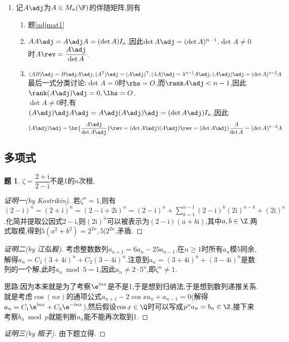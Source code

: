 \documentclass{article}
\newcommand{\T}{\mathsf{T}}
\renewcommand{\i}{\mathrm{i}}
\theoremstyle{definition}
\newtheorem{exercise}{题}[section]
\begin{document}
\begin{enumerate}
    \item 记$A\adj$为$A\in M_n(\F)$的伴随矩阵,则有\begin{enumerate}
        \item 题\ref{adjmat1}
        \item $AA\adj=A\adj A=(\det A)I_n$,因此$\det A\adj=(\det A)^{n-1}$.$\det A\neq 0$时$A\rev=\dfrac{A\adj}{\det A}$.
        \item $(AB)\adj=B\adj A\adj, (A^\T)\adj=(A\adj)^\T, (\lambda A)\adj=\lambda^{n-1}A\adj, (A\adj)\adj=(\det A)^{n-2}A$\\
        最后一式分类讨论:$\det A=0$时$\rhs=O$,而$\rank A\adj< n-1$,因此$\rank (A\adj)\adj=0, \lhs=O$.\\
        $\det A\neq 0$时,有$(A\adj)\adj A\adj=A\adj(A\adj)\adj=(\det A\adj)I_n$,因此$$(A\adj)\adj=\br{\dfrac{A\adj}{\det A\adj}}\rev=(\det A\adj)(A\adj)\rev=(\det A\adj)\dfrac{A}{\det A}=(\det A)^{n-2}A$$
    \end{enumerate}
\end{enumerate}

\subsection{多项式}
\begin{exercise}
    $\zeta=\dfrac{2+\i}{2-\i}$不是1的$n$次根.
\end{exercise}
\begin{proof}[证明一(by Kostrikin)]
    若$\zeta^n=1$,则有$ (2-\i)^n=(2+\i)^n=(2-\i+2\i)^n=(2-\i)^n+\sum_{k=1}^{n-1}(2-\i)^k(2\i)^{n-k}+(2\i)^n$.化简并提取公因式$2-\i$,则$(2\i)^n$可以被表示为$(2-\i)(a+b\i)$,其中$a,b\in \Z$.两式取模,得到$5(a^2+b^2)=2^{2n}, 5|2^{2n}$,矛盾.
\end{proof}
\begin{proof}[证明二(by 江弘毅)]
    考虑整数数列$a_{n+1}=6a_n-25a_{n-1}$,在$n\geq 1$时所有$a_n$模5同余,解得$a_n=C_1 (3+4\i)^n+C_2 (3-4\i)^n$.注意到$a_n=(3+4\i)^n+(3-4\i)^n$是数列的一个解,此时$a_n\bmod 5=1$,因此$a_n\neq 2\cdot 5^n$,即$\zeta^n\neq 1$.

    思路:因为本来就是为了考察$\e^{\i nx}$是不是1,于是想到归纳法,于是想到数列递推关系.就是考虑$\cos(nx)$的通项公式$a_{n+1}-2\cos x a_n+a_{n-1}=0$(解得$a_n=C_1\e^{\i nx}+C_2\e^{-\i nx}$),然后假设$\cos x\in \Q$时可以写成$p^n a_n=b_n\in \Z$,接下来考察$b_n\bmod p$就能判断$a_n$能不能再次取到1.
\end{proof}
\begin{proof}[证明三(by 瓶子)]
    由下题立得.
\end{proof}
\end{document}
